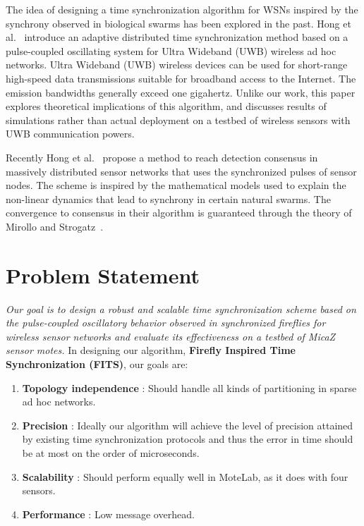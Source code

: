 \documentclass[8pt,twocolumn]{article}
\begin{document}
The idea of designing a time synchronization algorithm for WSNs inspired by
the synchrony observed in biological swarms has been explored in the past.
Hong et al.~\cite{ssp03, tsrbc03} introduce an adaptive distributed time
synchronization method based on a pulse-coupled oscillating system for Ultra
Wideband (UWB) wireless ad hoc networks.  Ultra Wideband (UWB) wireless
devices can be used for short-range high-speed data transmissions suitable
for broadband access to the Internet.
The emission bandwidths generally exceed one gigahertz.  Unlike our work,
this paper explores theoretical implications of this algorithm, and discusses
results of simulations rather than actual deployment on a testbed of wireless
sensors with UWB communication powers.

Recently Hong et al.~\cite{smrdc02} propose a method to reach detection
consensus in massively distributed sensor networks that uses the synchronized
pulses of sensor nodes.
The scheme is inspired by the mathematical models used to explain the
non-linear dynamics that lead to synchrony in certain natural swarms. The
convergence to consensus in their algorithm is guaranteed through the theory
of Mirollo and Strogatz~\cite{ms90}.

\section{Problem Statement}

\emph{Our goal is to design a robust and scalable time synchronization scheme 
based on the pulse-coupled oscillatory behavior observed in synchronized 
fireflies for wireless sensor networks and evaluate its effectiveness 
on a testbed of MicaZ sensor motes.} In designing 
our algorithm, {\bf Firefly Inspired Time Synchronization (FITS)}, our goals are:
\begin{enumerate}\addtolength{\itemsep}{-0.5\baselineskip}
\item {\bf Topology independence} : Should handle all kinds of partitioning
in sparse ad hoc networks.  
\item {\bf Precision} : Ideally our algorithm will achieve the level of
precision attained by existing time synchronization protocols and thus the
error in time should be at most on the order of microseconds.
\item {\bf Scalability} : Should perform equally well in MoteLab, as it does
with four sensors.  
\item {\bf Performance} : Low message overhead.
\end{enumerate}
\end{document}

